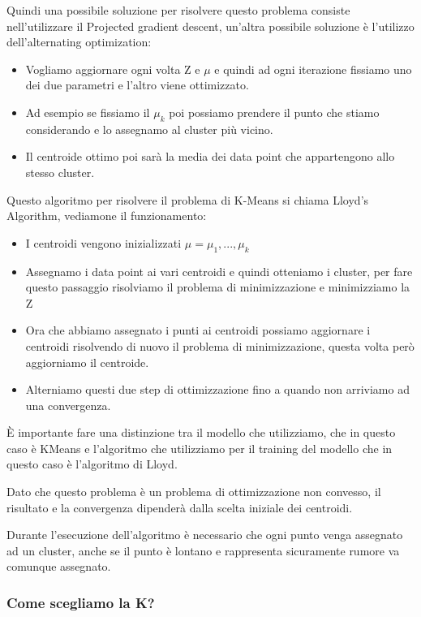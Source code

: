 \documentclass[14pt]{extreport}
\begin{document}
Quindi una possibile soluzione per risolvere questo problema consiste nell'utilizzare il Projected gradient descent, un'altra possibile soluzione è l'utilizzo
dell'alternating optimization:
\begin{itemize}
\item Vogliamo aggiornare ogni volta Z e $\mu$ e quindi ad ogni iterazione fissiamo uno dei due parametri e l'altro viene ottimizzato. 
\item Ad esempio se fissiamo il $\mu_k$ poi possiamo prendere il punto che stiamo considerando e lo assegnamo al cluster più vicino.
\item Il centroide ottimo poi sarà la media dei data point che appartengono allo stesso cluster.
\end{itemize}

Questo algoritmo per risolvere il problema di K-Means si chiama Lloyd's Algorithm, vediamone il funzionamento:
\begin{itemize}
\item I centroidi vengono inizializzati $\mu = {\mu_1,..., \mu_k}$
\item Assegnamo i data point ai vari centroidi e quindi otteniamo i cluster, per fare questo passaggio risolviamo il problema di minimizzazione e minimizziamo la Z
\item Ora che abbiamo assegnato i punti ai centroidi possiamo aggiornare i centroidi risolvendo di nuovo il problema di minimizzazione, questa volta però
aggiorniamo il centroide.
\item Alterniamo questi due step di ottimizzazione fino a quando non arriviamo ad una convergenza.
\end{itemize}

È importante fare una distinzione tra il modello che utilizziamo, che in questo caso è KMeans e l'algoritmo che utilizziamo per il training del modello
che in questo caso è l'algoritmo di Lloyd.

Dato che questo problema è un problema di ottimizzazione non convesso, il risultato e la convergenza dipenderà dalla scelta iniziale dei centroidi.

Durante l'esecuzione dell'algoritmo è necessario che ogni punto venga assegnato ad un cluster, anche se il punto è lontano e rappresenta sicuramente rumore 
va comunque assegnato.

\subsubsection{Come scegliamo la K?}
\end{document}
